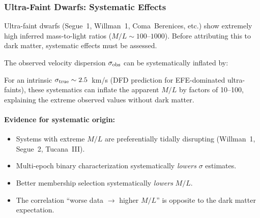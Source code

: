 \subsubsection{Ultra-Faint Dwarfs: Systematic Effects}

Ultra-faint dwarfs (Segue~1, Willman~1, Coma~Berenices, etc.) show extremely high inferred mass-to-light ratios ($M/L \sim 100$--$1000$). Before attributing this to dark matter, systematic effects must be assessed.

The observed velocity dispersion $\sigma_{\rm obs}$ can be systematically inflated by:

\begin{table}[h]
\centering
\caption{Systematic effects inflating ultra-faint $\sigma$ measurements.}\label{tab:uf-systematics}
\end{table}

For an intrinsic $\sigma_{\rm true} \sim 2.5$~km/s (DFD prediction for EFE-dominated ultra-faints), these systematics can inflate the apparent $M/L$ by factors of 10--100, explaining the extreme observed values without dark matter.

\paragraph{Evidence for systematic origin:}
\begin{itemize}
\item Systems with extreme $M/L$ are preferentially tidally disrupting (Willman~1, Segue~2, Tucana~III).
\item Multi-epoch binary characterization systematically \textit{lowers} $\sigma$ estimates.
\item Better membership selection systematically \textit{lowers} $M/L$.
\item The correlation ``worse data $\to$ higher $M/L$'' is opposite to the dark matter expectation.
\end{itemize}


